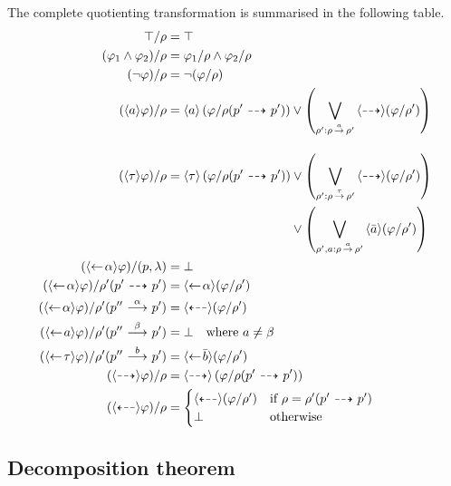 The complete quotienting transformation is summarised in the following table.
    \begin{align*}
    \true / \rho &= \true \\
    (\phi_1 \land \phi_2)/\rho &= \phi_1/\rho  \land \phi_2 / \rho \\
    (\neg\phi)/\rho &= \neg(\phi/\rho) \\
    (\dmnd{a}\phi) / \rho &= \dmnd{a} \left(\phi / \rho(p'\ptrans{} p')\right)
        \lor \left(\bigvee_{\rho' : \rho\transshort{a}\rho'} \pdmnd{} (\phi/\rho') \right)
    \\[1em]
    (\dmnd{\tau}\phi) / \rho &= \dmnd{\tau} \left(\phi / \rho(p'\ptrans{} p')\right)
        \lor \left(\bigvee_{\rho' : \rho\transshort{\tau}\rho'} \pdmnd{} (\phi/\rho') \right) \\
        &\phantom{= \dmnd{\tau} \left(\phi / \rho(p'\ptrans{} p')\right)\;}
        \lor \left( \bigvee_{\rho',a : \rho \transshort{a} \rho'} \dmnd{\bar{a}} (\phi/\rho')  \right) \\
    (\dmndback{\alpha}\phi) / (p,\lambda) &= \false \\
    (\dmndback{\alpha}\phi) / \rho'(p'\ptrans{} p') &= \dmndback{\alpha} (\phi / \rho') \\
    (\dmndback{\alpha}\phi) / \rho'(p''\trans{\alpha} p') &= \pdmndback{} (\phi / \rho') \\
    (\dmndback{a}\phi) / \rho'(p'' \trans{\beta} p') &= \false \quad\textrm{where $a\ne \beta$} \\
    (\dmndback{\tau}\phi) / \rho'(p'' \trans{b} p') &= \dmndback{\bar{b}} (\phi/\rho') \\
    (\pdmnd{}\phi) / \rho &= \pdmnd{} \left( \phi / \rho(p'\ptrans{} p') \right) \\
    (\pdmndback{}\phi) / \rho &= \begin{cases}
        \pdmndback{} (\phi / \rho') & \textrm{if $\rho = \rho'(p' \ptrans{} p')$} \\
        \false & \textrm{otherwise}
    \end{cases} \\
\end{align*}


\subsection{Decomposition theorem}\label{sub:theorem}

